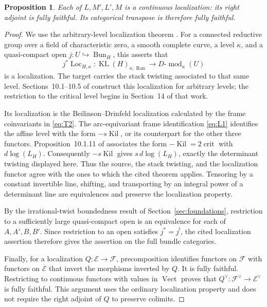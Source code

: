\documentclass[11pt]{article}
\numberwithin{equation}{section}
\newtheorem{proposition}[theorem]{Proposition}
\theoremstyle{definition}
\theoremstyle{remark}
\begin{document}
\begin{proposition}\label{equivalence:localization}
Each of \(L,M',L',M\) is a continuous localization: its right adjoint is
fully faithful.  Its categorical transpose is therefore fully faithful.
\end{proposition}

\begin{proof}
We use the arbitrary-level localization theorem
\cite[Theorem~13.4.2]{GLCII}.  For a connected reductive group over a field
of characteristic zero, a smooth complete curve, a level \(\kappa\), and
a quasi-compact open \(j:U\hookrightarrow\operatorname{Bun}_H\), this
asserts that
\[
 j^*\operatorname{Loc}_{H,\kappa}:
 \operatorname{KL}(H)_{\kappa,\operatorname{Ran}}
 \longrightarrow D\text{-}\operatorname{mod}_{\kappa}(U)
\]
is a localization.  The target carries the stack twisting associated to
that same level.  Sections~10.1--10.5 of \cite{GLCII} construct this
localization for arbitrary levels; the restriction to the critical level
begins in Section~14 of that work.

Its localization is the Beilinson--Drinfeld localization calculated by
the frame coinvariants in \eqref{eq:T2}.  The arc-equivariant frame
identification \eqref{eq:L1} identifies the affine level with the form
\(-s\operatorname{Kil}\), or its counterpart for the other three
functors.  Proposition~10.1.11 of \cite{GLCII} associates the form
\(-\operatorname{Kil}=2\operatorname{crit}\) with
\(d\log(L_H)\).  Consequently \(-s\operatorname{Kil}\) gives
\(s\,d\log(L_H)\), exactly the determinant twisting displayed here.
Thus the source, the stack twisting, and the localization functor agree
with the ones to which the cited theorem applies.  Tensoring by a
constant invertible line, shifting, and transporting by an integral
power of a determinant line are equivalences and preserve the
localization property.

By the irrational-twist boundedness result of
Section~\ref{sec:foundations}, restriction to a sufficiently large
quasi-compact open is an equivalence for each of \(A,A',B,B'\).  Since
restriction to an open satisfies \(j^*=j^!\), the cited localization
assertion therefore gives the assertion on the full bundle categories.

Finally, for a localization \(Q:\mathcal E\to\mathcal F\),
precomposition identifies functors on \(\mathcal F\) with functors on
\(\mathcal E\) that invert the morphisms inverted by \(Q\).  It is
fully faithful.  Restricting to continuous functors with values in
\(\operatorname{Vect}\) proves that
\(Q^\vee:\mathcal F^\vee\to\mathcal E^\vee\) is fully faithful.
This argument uses the ordinary localization property and does not
require the right adjoint of \(Q\) to preserve colimits.
\end{proof}
\end{document}

